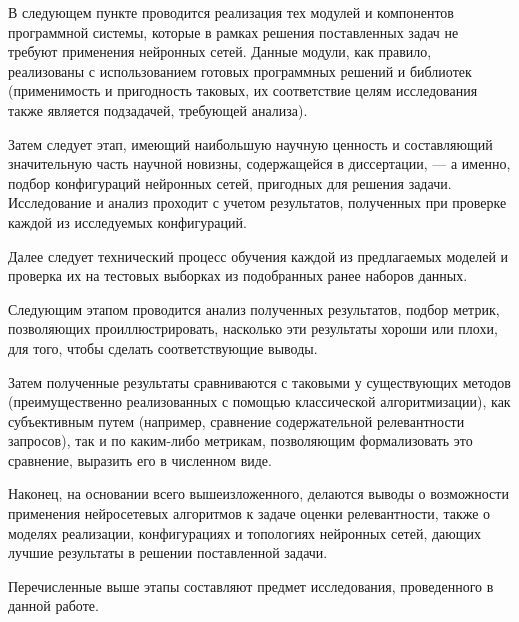В следующем пункте проводится реализация тех модулей и компонентов программной системы, которые в рамках
решения поставленных задач не требуют применения нейронных сетей. Данные модули, как правило, реализованы
с использованием готовых программных решений и библиотек (применимость и пригодность таковых, их соответствие
целям исследования также является подзадачей, требующей анализа).

Затем следует этап, имеющий наибольшую научную ценность и составляющий значительную часть научной новизны,
содержащейся в диссертации, --- а именно, подбор конфигураций нейронных сетей, пригодных для решения
задачи. Исследование и анализ проходит с учетом результатов, полученных при проверке каждой из исследуемых
конфигураций.

Далее следует технический процесс обучения каждой из предлагаемых моделей и проверка их на тестовых выборках
из подобранных ранее наборов данных.

Следующим этапом проводится анализ полученных результатов, подбор метрик, позволяющих проиллюстрировать,
насколько эти результаты хороши или плохи, для того, чтобы сделать соответствующие выводы.

Затем полученные результаты сравниваются с таковыми у существующих методов (преимущественно реализованных
с помощью классической алгоритмизации), как субъективным путем (например, сравнение содержательной
релевантности запросов), так и по каким-либо метрикам, позволяющим формализовать это сравнение, выразить
его в численном виде.

Наконец, на основании всего вышеизложенного, делаются выводы о возможности применения нейросетевых алгоритмов
к задаче оценки релевантности, также о моделях реализации, конфигурациях и топологиях нейронных сетей,
дающих лучшие результаты в решении поставленной задачи.

Перечисленные выше этапы составляют предмет исследования, проведенного в данной работе.